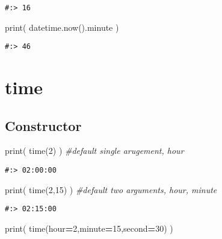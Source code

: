 \documentclass[
]{book}
\newenvironment{Shaded}{\begin{snugshade}}{\end{snugshade}}
\newcommand{\BuiltInTok}[1]{#1}
\newcommand{\CommentTok}[1]{\textcolor[rgb]{0.37,0.37,0.37}{\textit{#1}}}
\newcommand{\DecValTok}[1]{\textcolor[rgb]{0.06,0.06,0.06}{#1}}
\newcommand{\NormalTok}[1]{#1}
\newcommand{\OperatorTok}[1]{\textcolor[rgb]{0.43,0.43,0.43}{\textbf{#1}}}
\begin{document}
\begin{verbatim}
#:> 16
\end{verbatim}

\begin{Shaded}
\begin{Highlighting}[]
\BuiltInTok{print}\NormalTok{( datetime.now().minute )}
\end{Highlighting}
\end{Shaded}

\begin{verbatim}
#:> 46
\end{verbatim}

\hypertarget{time}{%
\section{time}\label{time}}

\hypertarget{constructor-5}{%
\subsection{Constructor}\label{constructor-5}}

\begin{Shaded}
\begin{Highlighting}[]
\BuiltInTok{print}\NormalTok{( time(}\DecValTok{2}\NormalTok{) )    }\CommentTok{\#default single arugement, hour}
\end{Highlighting}
\end{Shaded}

\begin{verbatim}
#:> 02:00:00
\end{verbatim}

\begin{Shaded}
\begin{Highlighting}[]
\BuiltInTok{print}\NormalTok{( time(}\DecValTok{2}\NormalTok{,}\DecValTok{15}\NormalTok{) ) }\CommentTok{\#default two arguments, hour, minute}
\end{Highlighting}
\end{Shaded}

\begin{verbatim}
#:> 02:15:00
\end{verbatim}

\begin{Shaded}
\begin{Highlighting}[]
\BuiltInTok{print}\NormalTok{( time(hour}\OperatorTok{=}\DecValTok{2}\NormalTok{,minute}\OperatorTok{=}\DecValTok{15}\NormalTok{,second}\OperatorTok{=}\DecValTok{30}\NormalTok{) )}
\end{Highlighting}
\end{Shaded}
\end{document}

